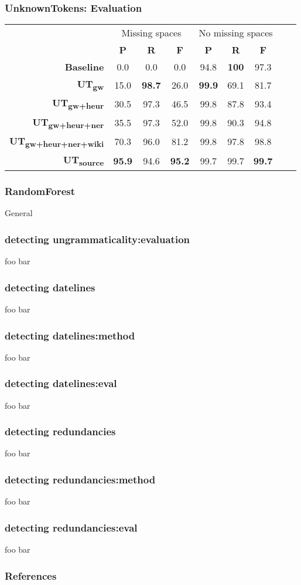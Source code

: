 \documentclass[table]{beamer}
\begin{document}
\begin{frame}
  \frametitle{\textbf{UnknownTokens}: Evaluation}
  \begin{tabular}{r|c|c|c|c|c|c|c|c|}
  & \multicolumn{3}{c|}{Missing spaces} & \multicolumn{3}{c|}{No missing spaces}\\
  & \textbf{P} & \textbf{R} & \textbf{F} & \textbf{P} & \textbf{R} & \textbf{F}\\
  \hline
  \textbf{Baseline} & 0.0 & 0.0 & 0.0 & 94.8 & \textbf{100} & 97.3\\
  \hline
  \textbf{UT\textsubscript{gw}} & 15.0 & \textbf{98.7} & 26.0 & \textbf{99.9} & 69.1 & 81.7\\
  \hline
  \textbf{UT\textsubscript{gw+heur}} & 30.5 & 97.3 & 46.5 & 99.8 & 87.8 & 93.4\\
  \hline
  \textbf{UT\textsubscript{gw+heur+ner}} & 35.5 & 97.3 & 52.0 & 99.8 & 90.3 & 94.8\\
  \hline
  \textbf{UT\textsubscript{gw+heur+ner+wiki}} & 70.3 & 96.0 & 81.2 & 99.8 & 97.8 & 98.8\\
  \hline
  \textbf{UT\textsubscript{source}} & \textbf{95.9} & 94.6 & \textbf{95.2} & 99.7 & 99.7 & \textbf{99.7}\\
  \hline
  \end{tabular}
\end{frame}

\begin{frame}
  \frametitle{RandomForest}
  General
\end{frame}

\begin{frame}
  \frametitle{detecting ungrammaticality:evaluation}
  foo bar
\end{frame}

\begin{frame}
  \frametitle{detecting datelines}
  foo bar
\end{frame}

\begin{frame}
  \frametitle{detecting datelines:method}
  foo bar
\end{frame}

\begin{frame}
  \frametitle{detecting datelines:eval}
  foo bar
\end{frame}

\begin{frame}
  \frametitle{detecting redundancies}
  foo bar
\end{frame}

\begin{frame}
  \frametitle{detecting redundancies:method}
  foo bar
\end{frame}

\begin{frame}
  \frametitle{detecting redundancies:eval}
  foo bar
\end{frame}

\begin{frame}
  \frametitle{References}
  
  
\end{frame}
\end{document}
